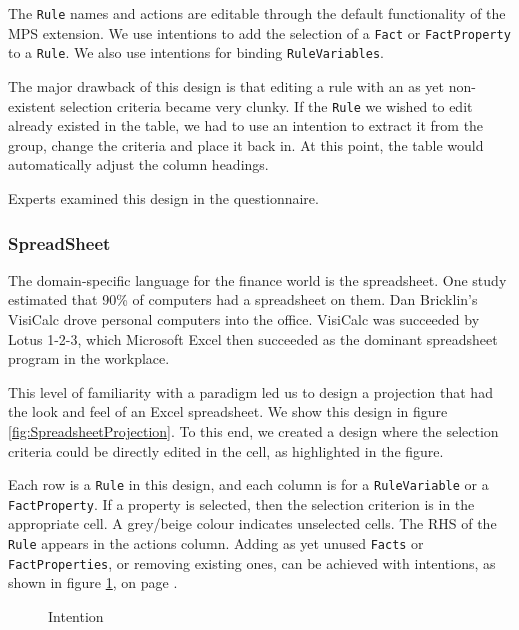 The \texttt{Rule} names and actions are editable through the default functionality of the MPS extension.
We use intentions to add the selection of a \texttt{Fact} or \texttt{FactProperty} to a \texttt{Rule}.
We also use intentions for binding \texttt{RuleVariables}.

The major drawback of this design is that editing a rule with an as yet non-existent selection criteria became very clunky.
If the \texttt{Rule} we wished to edit already existed in the table, we had to use an intention to extract it from the group, change the criteria and place it back in.
At this point, the table would automatically adjust the column headings.

Experts examined this design in the questionnaire.

\subsubsection{SpreadSheet}

The domain-specific language for the finance world is the spreadsheet.
One study estimated that 90\% of computers had a spreadsheet on them\cite{bradley2009using}.
Dan Bricklin's VisiCalc drove personal computers into the office.
VisiCalc was succeeded by Lotus 1-2-3, which Microsoft Excel then succeeded as the dominant spreadsheet program in the workplace.

This level of familiarity with a paradigm led us to design a projection that had the look and feel of an Excel spreadsheet.
We show this design in figure \ref{fig:SpreadsheetProjection}.
To this end, we created a design where the selection criteria could be directly edited in the cell, as highlighted in the figure.

Each row is a \texttt{Rule} in this design, and each column is for a \texttt{RuleVariable} or a \texttt{FactProperty}.
If a property is selected, then the selection criterion is in the appropriate cell.
A grey/beige colour indicates unselected cells.
The RHS of the \texttt{Rule} appears in the actions column.
Adding as yet unused \texttt{Facts} or \texttt{FactProperties}, or removing existing ones, can be achieved with intentions, as shown in figure \ref{fig:SpreadsheetIntentions}, on page \pageref{fig:SpreadsheetIntentions}.

\begin{figure}[h]
    \centering
    \caption{Intention}
    \label{fig:SpreadsheetIntentions}
\end{figure}

